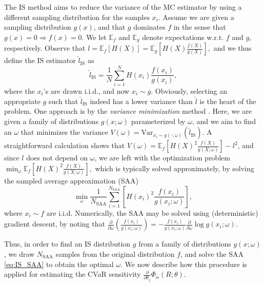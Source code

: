 \documentclass[letterpaper]{article}
\newcommand{\variance}{\mathrm{Var}}
\newcommand{\E}{\mathbb{E}}
\newcommand{\cvar}{\Phi_\alpha}
\newcommand{\is}{\textrm{IS}}
\newcommand{\Dth}{\frac{\partial}{\partial \theta_j}}
\newcommand{\Dom}{\frac{\partial}{\partial \omega}}
\begin{document}
The IS method aims to reduce the variance of the MC estimator by using a different sampling distribution for the samples $x_i$. Assume we are given a sampling distribution $g(x)$, and that $g$ dominates $f$ in the sense that $g(x) = 0 \Rightarrow f(x) = 0$. We let $\E_f$ and $\E_g$ denote expectations w.r.t. $f$ and $g$, respectively. Observe that
$%
l = \E_f \left[ H(X)\right] = \E_g \left[ H(X)\frac{f(X)}{g(X)}\right],
$%
and we thus define the IS estimator $\hat{l}_{\is}$ as
\begin{equation}\label{eq:IS_general}
\hat{l}_{\is} = \frac{1}{N}\sum_{i=1}^{N}H(x_i)\frac{f(x_i)}{g(x_i)},
\end{equation}
where the $x_i$'s are drawn i.i.d., and now $x_i \sim g$. Obviously, selecting an appropriate $g$ such that $\hat{l}_{\is}$ indeed has a lower variance than $\hat{l}$ is the heart of the problem. One approach is by the \emph{variance minimization} method \cite{rubinstein2011simulation}. Here, we are given a family of distributions $g(x;\omega)$ parameterized by $\omega$, and we aim to find an $\omega$ that minimizes the variance $V(\omega) = \variance_{x_i\sim g(\cdot;\omega)} \left( \hat{l}_{\is} \right)$. A straightforward calculation shows that
$V(\omega) = \E_f \left[ H(X)^2 \frac{f(X)}{g(X;\omega)}\right] - l^2$, and since $l$ does not depend on $\omega$, we are left with the optimization problem
$
\min_\omega \E_f \left[ H(X)^2 \frac{f(X)}{g(X;\omega)}\right],
$
which is typically solved approximately, by solving the sampled average approximation (SAA)
\begin{equation}\label{eq:IS_SAA}
\min_\omega \frac{1}{N_{\textrm{SAA}}}\sum_{i=1}^{N_{\textrm{SAA}}} \left[ H(x_i)^2 \frac{f(x_i)}{g(x_i;\omega)}\right],
\end{equation}
where $x_i \sim f$ are i.i.d. Numerically, the SAA may be solved using (deterministic) gradient descent, by noting that $\Dom \left( \frac{f(x_i)}{g(x_i;\omega)} \right) = - \frac{f(x_i)}{g(x_i;\omega)} \Dom \log g(x_i;\omega)$.

Thus, in order to find an IS distribution $g$ from a family of distributions $g(x;\omega)$, we draw $N_{\textrm{SAA}}$ samples from the original distribution $f$, and solve the SAA \eqref{eq:IS_SAA} to obtain the optimal $\omega$. We now describe how this procedure is applied for estimating the CVaR sensitivity $\Dth\cvar (R;\theta)$.
\end{document}
